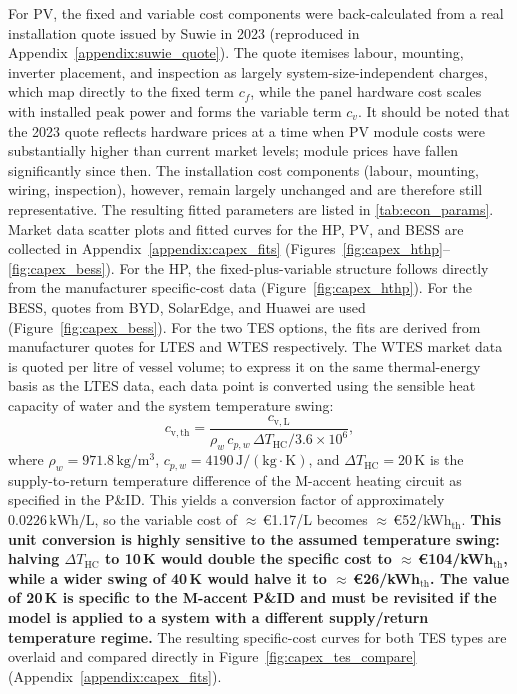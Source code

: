 \documentclass[11pt,a4paper]{report}
\begin{document}
\noindent For PV, the fixed and variable cost components were back-calculated from a real
installation quote issued by Suwie in 2023 (reproduced in
Appendix~\ref{appendix:suwie_quote}).
The quote itemises labour, mounting, inverter placement, and inspection as largely
system-size-independent charges, which map directly to the fixed term $c_f$, while the
panel hardware cost scales with installed peak power and forms the variable term $c_v$.
It should be noted that the 2023 quote reflects hardware prices at a time when PV module
costs were substantially higher than current market levels; module prices have fallen
significantly since then.
The installation cost components (labour, mounting, wiring, inspection), however, remain
largely unchanged and are therefore still representative.
The resulting fitted parameters are listed in \autoref{tab:econ_params}.
Market data scatter plots and fitted curves for the HP, PV, and BESS are collected in
Appendix~\ref{appendix:capex_fits}
(Figures~\ref{fig:capex_hthp}--\ref{fig:capex_bess}).
For the HP, the fixed-plus-variable structure follows directly from the manufacturer
specific-cost data (Figure~\ref{fig:capex_hthp}).
For the BESS, quotes from BYD, SolarEdge, and Huawei are used
(Figure~\ref{fig:capex_bess}).
For the two TES options, the fits are derived from manufacturer quotes for LTES and WTES
respectively.
The WTES market data is quoted per litre of vessel volume; to express it on the same
thermal-energy basis as the LTES data, each data point is converted using the sensible
heat capacity of water and the system temperature swing:
\begin{equation}
    c_\mathrm{v,th} = \frac{c_\mathrm{v,L}}{\rho_w\, c_{p,w}\, \Delta T_\mathrm{HC} / 3.6 \times 10^6},
    \label{eq:wtes_eur_per_kwh}
\end{equation}
where $\rho_w = 971.8\,\mathrm{kg/m^3}$, $c_{p,w} = 4190\,\mathrm{J/(kg\cdot K)}$, and
$\Delta T_\mathrm{HC} = 20\,\mathrm{K}$ is the supply-to-return temperature difference
of the M-accent heating circuit as specified in the P\&ID.
This yields a conversion factor of approximately $0.0226\,\mathrm{kWh/L}$, so the
variable cost of ${\approx}$\,\euro1.17/L becomes ${\approx}$\,\euro52/kWh$_\mathrm{th}$.
\textbf{This unit conversion is highly sensitive to the assumed temperature swing: halving
$\Delta T_\mathrm{HC}$ to 10\,K would double the specific cost to
${\approx}$\,\euro104/kWh$_\mathrm{th}$, while a wider swing of 40\,K would halve it to
${\approx}$\,\euro26/kWh$_\mathrm{th}$.
The value of 20\,K is specific to the M-accent P\&ID and must be revisited if the
model is applied to a system with a different supply/return temperature regime.}
The resulting specific-cost curves for both TES types are overlaid and compared directly in
Figure~\ref{fig:capex_tes_compare} (Appendix~\ref{appendix:capex_fits}).
\end{document}
